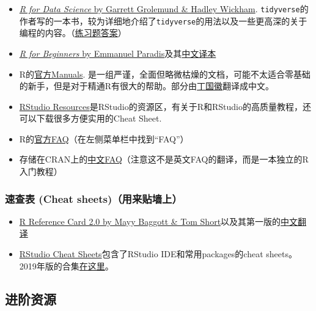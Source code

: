 \documentclass[]{book}
\providecommand{\tightlist}{%
  \setlength{\itemsep}{0pt}\setlength{\parskip}{0pt}}
\begin{document}
\begin{itemize}
\tightlist
\item
  \href{https://r4ds.had.co.nz}{\emph{R for Data Science} by Garrett Grolemund \& Hadley Wickham}. \texttt{tidyverse}的作者写的一本书，较为详细地介绍了\texttt{tidyverse}的用法以及一些更高深的关于编程的内容。（\href{https://jrnold.github.io/r4ds-exercise-solutions/}{练习题答案}）
\item
  \href{https://cran.r-project.org/doc/contrib/Paradis-rdebuts_en.pdf}{\emph{R for Beginners} by Emmanuel Paradis}及其\href{https://github.com/DingGuohui/R-for-beginer/blob/master/rdebuts_cn\%200.2.pdf}{中文译本}
\item
  R的\href{https://cran.r-project.org/manuals.html}{官方Manuals}.
  是一组严谨，全面但略微枯燥的文档，可能不太适合零基础的新手，但是对于精通R有很大的帮助。部分由\href{https://github.com/dingguohui}{丁国徽}翻译成中文。
\item
  \href{https://resources.rstudio.com}{RStudio Resources}是RStudio的资源区，有关于R和RStudio的高质量教程，还可以下载很多方便实用的Cheat Sheet.
\item
  R的\href{https://cran.r-project.org}{官方FAQ}（在左侧菜单栏中找到``FAQ''）
\item
  存储在CRAN上的\href{https://cran.r-project.org/doc/contrib/Liu-FAQ.pdf}{中文FAQ}（注意这不是英文FAQ的翻译，而是一本独立的R入门教程）
\end{itemize}

\hypertarget{cheatsheet}{%
\subsubsection{速查表 (Cheat sheets)（用来贴墙上）}\label{cheatsheet}}

\begin{itemize}
\tightlist
\item
  \href{https://cran.r-project.org/doc/contrib/Baggott-refcard-v2.pdf}{R Reference Card 2.0 by Mayy Baggott \& Tom Short}以及其第一版的\href{https://cran.r-project.org/doc/contrib/Liu-R-refcard.pdf}{中文翻译}
\item
  \href{https://www.rstudio.com/resources/cheatsheets/}{RStudio Cheat Sheets}包含了RStudio IDE和常用packages的cheat sheets。2019年版的合集\href{https://www.rstudio.com/wp-content/uploads/2019/01/Cheatsheets_2019.pdf}{在这里}。
\end{itemize}

\subsection{进阶资源}
\end{document}
